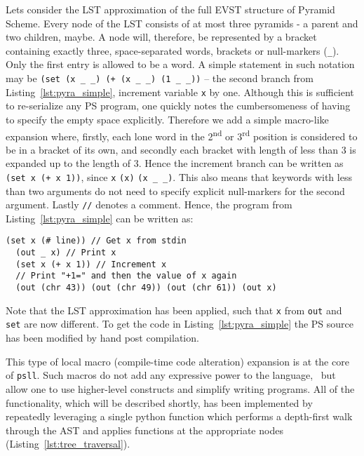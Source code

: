 \documentclass[aip,jcp,reprint,footinbib]{revtex4-1}
\makeatletter
\let\tt\texttt
\newcommand\psll{\texttt{psll}\xspace}
\newcommand{\ilpsll}[1]{\lstinline[language=psll,columns=flexible]{#1}}
\renewcommand\paragraph{\@startsection{paragraph}{4}{\parindent}{\parskip}{-1em}{\normalfont \normalsize \bfseries}}
\makeatother
\begin{document}
\paragraph{Bracket structure} Lets consider the LST approximation of the full EVST structure of Pyramid Scheme. Every node of the LST consists of at most three pyramids - a parent and two children, maybe. A node will, therefore, be represented by a bracket containing exactly three, space-separated words, brackets or null-markers (\ilpsll{_}). Only the first entry is allowed to be a word. A simple statement in such notation may be \ilpsll{(set (x _ _) (+ (x _ _) (1 _ _))} -- the second branch from Listing~\ref{lst:pyra_simple}, increment variable \tt{x} by one. Although this is sufficient to re-serialize any PS program, one quickly notes the cumbersomeness of having to specify the empty space explicitly. Therefore we add a simple macro-like expansion where, firstly, each lone word in the 2\textsuperscript{nd} or 3\textsuperscript{rd} position is considered to be in a bracket of its own, and secondly each bracket with length of less than 3 is expanded up to the length of 3. Hence the increment branch can be written as \ilpsll{(set x (+ x 1))}, since \ilpsll{x} \textrightarrow \ilpsll{(x)} \textrightarrow \ilpsll{(x _ _)}. This also means that keywords with less than two arguments do not need to specify explicit null-markers for the second argument. Lastly \tt{//} denotes a comment. Hence, the program from Listing~\ref{lst:pyra_simple} can be written as:
\begin{lstlisting}[language=psll,
    label=lst:psll_simple, caption={
    LST approximation of the program from Listing~\ref{lst:pyra_simple} in simple \psll notation.
}]
  (set x (# line)) // Get x from stdin
  (out _ x) // Print x
  (set x (+ x 1)) // Increment x
  // Print "+1=" and then the value of x again
  (out (chr 43)) (out (chr 49)) (out (chr 61)) (out x)
\end{lstlisting}
Note that the LST approximation has been applied, such that \tt{x} from \tt{out} and \tt{set} are now different. To get the code in Listing~\ref{lst:pyra_simple} the PS source has been modified by hand post compilation.

This type of local macro (compile-time code alteration) expansion is at the core of \psll. Such macros do not add any expressive power to the language,~\cite{krishnamurthi2019} but allow one to use higher-level constructs and simplify writing programs. All of the functionality, which will be described shortly, has been implemented by repeatedly leveraging a single python function which performs a depth-first walk through the AST and applies functions at the appropriate nodes (Listing~\ref{lst:tree_traversal}).
\end{document}
